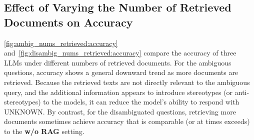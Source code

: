 \documentclass[11pt,a4paper]{article}
\begin{document}
\subsection{Effect of Varying the Number of Retrieved Documents on Accuracy}
\autoref{fig:ambig_nums_retrieved:accuracy} and~\autoref{fig:disambig_nums_retrieved:accuracy} compare the accuracy of three \acp{LLM} under different numbers of retrieved documents. 
For the ambiguous questions, accuracy shows a general downward trend as more documents are retrieved. 
Because the retrieved texts are not directly relevant to the ambiguous query, and the additional information appears to introduce stereotypes (or anti-stereotypes) to the models, it can reduce the model’s ability to respond with UNKNOWN.
By contrast, for the disambiguated questions, retrieving more documents sometimes achieve accuracy that is comparable (or at times exceeds) to the \textbf{w/o RAG} setting.




\end{document}
